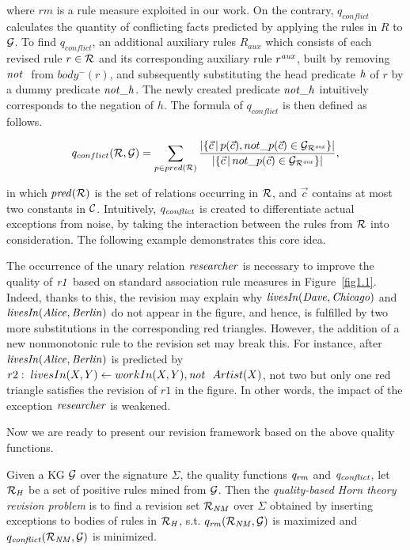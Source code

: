 where $rm$ is a rule measure exploited in our work. On the contrary, $q_{conflict}$ calculates the quantity of conflicting facts predicted by applying the rules in $R$ to $\mathcal{G}$. To find $q_{conflict}$, an additional auxiliary rules $R_{aux}$ which consists of each revised rule $r \in \mathcal{R}$ and its corresponding auxiliary rule $r^{\mathit{aux}}$, built by removing $\naf$ from $body^-(r)$, and subsequently substituting the head predicate $\mathit{h}$ of $r$ by a dummy predicate $\mathit{not\_h}$. The newly created predicate $\mathit{not\_h}$ intuitively corresponds to the negation of $h$. The formula of $q_{conflict}$ is then defined as follows.

\begin{equation}
q_{conflict}(\mathcal{R},\mathcal{G})=\sum_{p\in pred(\mathcal{R})} \dfrac{|\{ \vec{c}\,|\,p(\vec{c}),not\_p(\vec{c})\in \mathcal{G}_{\mathcal{R}^{\mathit{aux}}}\} |}{|\{ \vec{c}\,|\,not\_p(\vec{c})\in \mathcal{G}_{\mathcal{R}^{\mathit{aux}}}\} |}
\label{eq:conflict},
\end{equation}

in which $\mathit{pred(\mathcal{R})}$ is the set of relations occurring in $\mathcal{R}$, and $\vec{c}$ contains at most two constants in $\mathcal{C}$. Intuitively, $q_{\mathit{conflict}}$ is created to differentiate actual exceptions from noise, by taking the interaction between the rules from $\mathcal{R}$ into consideration. The following example demonstrates this core idea.

\begin{example}

The occurrence of the unary relation $\mathit{researcher}$ is necessary to improve the quality of $\mathit{r1}$ based on standard association rule measures in Figure~\ref{fig1.1}. Indeed, thanks to this, the revision may explain why $\mathit{livesIn(Dave,Chicago)}$ and $\mathit{livesIn(Alice,Berlin)}$ do not appear in the figure, and hence, is fulfilled by two more substitutions in the corresponding red triangles. However, the addition of a new nonmonotonic rule to the revision set may break this. For instance, after $\mathit{livesIn(Alice,Berlin)}$ is predicted by $r2:\; livesIn(X,Y)\leftarrow workIn(X,Y),\mathit{not}~ \ Artist(X)$, not two but only one red triangle satisfies the revision of $r1$ in the figure. In other words, the impact of the exception $\mathit{researcher}$ is weakened.
\end{example}

Now we are ready to present our revision framework based on the above quality functions.

\begin{definition} \label{def:qhtr}
Given a KG $\mathcal{G}$ over the signature $\Sigma$, the quality functions $\mathit{q_{rm}}$ and $\mathit{q_{conflict}}$, let $\mathcal{R}_{\mathit{H}}$ be a set of positive rules mined from $\mathcal{G}$. Then the \emph{quality-based Horn theory revision problem} is to find a revision set $\mathcal{R}_{\mathit{NM}}$ over $\Sigma$ obtained by inserting exceptions to bodies of rules in $\mathcal{R}_{\mathit{H}}$, s.t. $q_{\mathit{rm}}(\mathcal{R}_{\mathit{NM}},\mathcal{G})$ is maximized and $q_{\mathit{conflict}}(\mathcal{R}_{\mathit{NM}},\mathcal{G})$ is minimized.
\end{definition}

